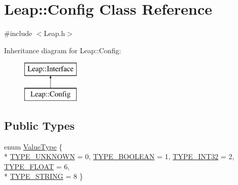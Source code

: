 \hypertarget{class_leap_1_1_config}{\section{Leap\+:\+:Config Class Reference}
\label{class_leap_1_1_config}
}


{\ttfamily \#include $<$Leap.\+h$>$}

Inheritance diagram for Leap\+:\+:Config\+:\begin{figure}[H]
\begin{center}
\leavevmode
\includegraphics[height=2.000000cm]{class_leap_1_1_config}
\end{center}
\end{figure}
\subsection*{Public Types}
\begin{DoxyCompactItemize}
\item 
enum \hyperlink{class_leap_1_1_config_aee9819af7eacacc324aa72619310a9d8}{Value\+Type} \{ \\*
\hyperlink{class_leap_1_1_config_aee9819af7eacacc324aa72619310a9d8a61027e87139ecf1153e7b7f41fd9adfa}{T\+Y\+P\+E\+\_\+\+U\+N\+K\+N\+O\+W\+N} = 0, 
\hyperlink{class_leap_1_1_config_aee9819af7eacacc324aa72619310a9d8a592e8eabddb7d95b192fee923c423760}{T\+Y\+P\+E\+\_\+\+B\+O\+O\+L\+E\+A\+N} = 1, 
\hyperlink{class_leap_1_1_config_aee9819af7eacacc324aa72619310a9d8af552faf6063e26e0b5a995c344cfaebd}{T\+Y\+P\+E\+\_\+\+I\+N\+T32} = 2, 
\hyperlink{class_leap_1_1_config_aee9819af7eacacc324aa72619310a9d8a85ccbf5a55972697b350b394f7d87cfa}{T\+Y\+P\+E\+\_\+\+F\+L\+O\+A\+T} = 6, 
\\*
\hyperlink{class_leap_1_1_config_aee9819af7eacacc324aa72619310a9d8a312ad72cfe51163b2817732f7530e04e}{T\+Y\+P\+E\+\_\+\+S\+T\+R\+I\+N\+G} = 8
 \}
\end{DoxyCompactItemize}
